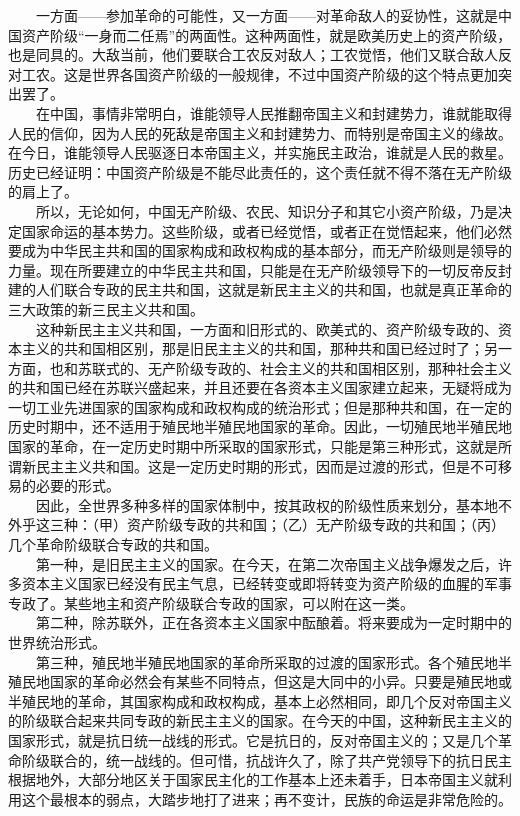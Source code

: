 \documentclass[cn,11pt,chinese]{elegantbook}
\begin{document}
　　一方面——参加革命的可能性，又一方面——对革命敌人的妥协性，这就是中国资产阶级“一身而二任焉”的两面性。这种两面性，就是欧美历史上的资产阶级，也是同具的。大敌当前，他们要联合工农反对敌人；工农觉悟，他们又联合敌人反对工农。这是世界各国资产阶级的一般规律，不过中国资产阶级的这个特点更加突出罢了。\\
　　在中国，事情非常明白，谁能领导人民推翻帝国主义和封建势力，谁就能取得人民的信仰，因为人民的死敌是帝国主义和封建势力、而特别是帝国主义的缘故。在今日，谁能领导人民驱逐日本帝国主义，并实施民主政治，谁就是人民的救星。历史已经证明：中国资产阶级是不能尽此责任的，这个责任就不得不落在无产阶级的肩上了。\\
　　所以，无论如何，中国无产阶级、农民、知识分子和其它小资产阶级，乃是决定国家命运的基本势力。这些阶级，或者已经觉悟，或者正在觉悟起来，他们必然要成为中华民主共和国的国家构成和政权构成的基本部分，而无产阶级则是领导的力量。现在所要建立的中华民主共和国，只能是在无产阶级领导下的一切反帝反封建的人们联合专政的民主共和国，这就是新民主主义的共和国，也就是真正革命的三大政策的新三民主义共和国。\\
　　这种新民主主义共和国，一方面和旧形式的、欧美式的、资产阶级专政的、资本主义的共和国相区别，那是旧民主主义的共和国，那种共和国已经过时了；另一方面，也和苏联式的、无产阶级专政的、社会主义的共和国相区别，那种社会主义的共和国已经在苏联兴盛起来，并且还要在各资本主义国家建立起来，无疑将成为一切工业先进国家的国家构成和政权构成的统治形式；但是那种共和国，在一定的历史时期中，还不适用于殖民地半殖民地国家的革命。因此，一切殖民地半殖民地国家的革命，在一定历史时期中所采取的国家形式，只能是第三种形式，这就是所谓新民主主义共和国。这是一定历史时期的形式，因而是过渡的形式，但是不可移易的必要的形式。\\
　　因此，全世界多种多样的国家体制中，按其政权的阶级性质来划分，基本地不外乎这三种：（甲）资产阶级专政的共和国；（乙）无产阶级专政的共和国；（丙）几个革命阶级联合专政的共和国。\\
　　第一种，是旧民主主义的国家。在今天，在第二次帝国主义战争爆发之后，许多资本主义国家已经没有民主气息，已经转变或即将转变为资产阶级的血腥的军事专政了。某些地主和资产阶级联合专政的国家，可以附在这一类。\\
　　第二种，除苏联外，正在各资本主义国家中酝酿着。将来要成为一定时期中的世界统治形式。\\
　　第三种，殖民地半殖民地国家的革命所采取的过渡的国家形式。各个殖民地半殖民地国家的革命必然会有某些不同特点，但这是大同中的小异。只要是殖民地或半殖民地的革命，其国家构成和政权构成，基本上必然相同，即几个反对帝国主义的阶级联合起来共同专政的新民主主义的国家。在今天的中国，这种新民主主义的国家形式，就是抗日统一战线的形式。它是抗日的，反对帝国主义的；又是几个革命阶级联合的，统一战线的。但可惜，抗战许久了，除了共产党领导下的抗日民主根据地外，大部分地区关于国家民主化的工作基本上还未着手，日本帝国主义就利用这个最根本的弱点，大踏步地打了进来；再不变计，民族的命运是非常危险的。\\
\end{document}

